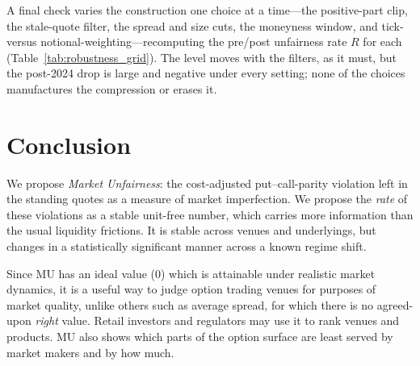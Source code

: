 \documentclass[12pt]{article}
\begin{document}
A final check varies the construction one choice at a time---the positive-part clip, the stale-quote filter, the spread and size cuts, the moneyness window, and tick- versus notional-weighting---recomputing the pre/post unfairness rate $R$ for each (Table~\ref{tab:robustness_grid}). The level moves with the filters, as it must, but the post-2024 drop is large and negative under every setting; none of the choices manufactures the compression or erases it.

\begin{table}[htbp]
    \centering\small
    {\renewcommand{\arraystretch}{1.15}}
    \caption{Robustness of the pre/post-2024 unfairness rate $R$ to the filter and aggregation choices, each varied one at a time from the baseline (top row): the positive-part clip, the stale-quote filter, the spread and minimum-size cuts, the moneyness window, and whether we average R with weights corresponding to the maximum tradable size on a tickpath, or whether each tickpath has equal weights. The table shows the stability of $\Delta$, the post$-$pre $R$ change.}
    \label{tab:robustness_grid}
\end{table}

\section{Conclusion}
\label{sec:concl}
We propose \emph{Market Unfairness}: the cost-adjusted put--call-parity violation left in the standing quotes as a measure of market imperfection. We propose the \emph{rate} of these violations as a stable unit-free number, which carries more information than the usual liquidity frictions. It is stable across venues and underlyings, but changes in a statistically significant manner across a known regime shift. 

Since MU has an ideal value (0) which is attainable under realistic market dynamics, it is a useful way to judge option trading venues for purposes of market quality, unlike others such as average spread, for which there is no agreed-upon \emph{right} value.  Retail investors and regulators may use it to rank venues and products. MU also shows which parts of the option surface are least served by market makers and by how much.



\end{document}

